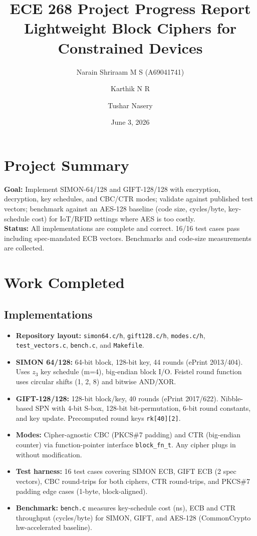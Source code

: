 \documentclass[10pt]{article}
\title{\vspace{-1.5em}ECE 268 Project Progress Report\\[0.2em]
\large Lightweight Block Ciphers for Constrained Devices}
\author{%
  Narain Shriraam M S (A69041741) \and
  Karthik N R \and
  Tushar Nasery
}
\date{June 3, 2026}
\begin{document}
\maketitle
\vspace{-1.2em}

\section*{Project Summary}
\textbf{Goal:} Implement SIMON-64/128 and GIFT-128/128 with encryption, decryption, key schedules, and CBC/CTR modes; validate against published test vectors; benchmark against an AES-128 baseline (code size, cycles/byte, key-schedule cost) for IoT/RFID settings where AES is too costly. \\
\textbf{Status:} All implementations are complete and correct. 16/16 test cases pass including spec-mandated ECB vectors. Benchmarks and code-size measurements are collected.

\section{Work Completed}

\subsection*{Implementations}
\begin{itemize}
  \item \textbf{Repository layout:} \texttt{simon64.c/h}, \texttt{gift128.c/h}, \texttt{modes.c/h}, \texttt{test\_vectors.c}, \texttt{bench.c}, and \texttt{Makefile}.
  \item \textbf{SIMON 64/128:} 64-bit block, 128-bit key, 44 rounds (ePrint 2013/404). Uses $z_3$ key schedule (m=4), big-endian block I/O. Feistel round function uses circular shifts (1, 2, 8) and bitwise AND/XOR.
  \item \textbf{GIFT-128/128:} 128-bit block/key, 40 rounds (ePrint 2017/622). Nibble-based SPN with 4-bit S-box, 128-bit bit-permutation, 6-bit round constants, and key update. Precomputed round keys \texttt{rk[40][2]}.
  \item \textbf{Modes:} Cipher-agnostic CBC (PKCS\#7 padding) and CTR (big-endian counter) via function-pointer interface \texttt{block\_fn\_t}. Any cipher plugs in without modification.
  \item \textbf{Test harness:} 16 test cases covering SIMON ECB, GIFT ECB (2 spec vectors), CBC round-trips for both ciphers, CTR round-trips, and PKCS\#7 padding edge cases (1-byte, block-aligned).
  \item \textbf{Benchmark:} \texttt{bench.c} measures key-schedule cost (ns), ECB and CTR throughput (cycles/byte) for SIMON, GIFT, and AES-128 (CommonCrypto hw-accelerated baseline).
\end{itemize}
\end{document}
